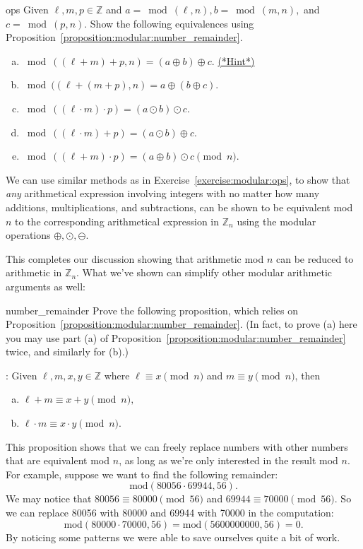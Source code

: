 \begin{exercise}{ops}
Given $\ell,m,p \in {\mathbb Z}$ and $a=\bmod(\ell,n), b=\bmod(m,n),$ and $c=\bmod(p,n)$.  Show the  following equivalences using Proposition~\ref{proposition:modular:number_remainder}.
\begin{enumerate}[(a)]
\item
$\bmod( (\ell +m) + p,n) = (a \oplus b) \oplus c$.\qquad
\hyperref[sec:modular_arithmetic:hints]{(*Hint*)}
\item
$\bmod( (\ell + (m + p),n) = a \oplus (b \oplus c)$.
\item
$\bmod( (\ell \cdot m) \cdot p) = (a \odot b) \odot c .$
\item
$ \bmod((\ell \cdot m) + p) = (a \odot b) \oplus c . $
\item
$ \bmod((\ell + m) \cdot p) = (a \oplus b) \odot c \pmod{n}. $
\end{enumerate}
\end{exercise}

We can use similar methods as in Exercise~\ref{exercise:modular:ops}, to show that \emph{any} arithmetical expression involving integers with no matter how many additions, multiplications, and subtractions, can be shown to be equivalent mod $n$ to the corresponding arithmetical expression in ${\mathbb Z}_n$ using the modular operations $\oplus, \odot, \ominus$.

This completes our discussion showing that arithmetic mod $n$ can be reduced to arithmetic in ${\mathbb Z}_n$.  What we've shown can simplify other modular arithmetic arguments as well:

\begin{exercise}{number_remainder}
Prove the following proposition, which relies on Proposition~\ref{proposition:modular:number_remainder}.  (In fact, to prove (a) here you may use  part (a) of   Proposition~\ref{proposition:modular:number_remainder} twice, and similarly for (b).)

: Given $\ell,m,x,y \in {\mathbb Z}$ where $\ell \equiv x \pmod{n}$ and $m \equiv y \pmod{n}$, then 

\begin{enumerate}[(a)]
\item
$\ell + m \equiv x + y \pmod{n},$ 
\item
$\ell \cdot m \equiv x \cdot y \pmod{n}$.
\end{enumerate}
\end{exercise}

This proposition shows that we can freely replace numbers with other numbers that are equivalent mod $n$,  as long as we're only interested in the result mod $n$. For example, suppose we  want to find the following remainder:  
\[
\text{mod}(80056 \cdot 69944, 56).  
\]
We may notice that $80056 \equiv 80000 \pmod{56}$ and $69944 \equiv 70000 \pmod{56}$.  So we can replace 80056 with 80000 and 69944 with 70000 in the computation:
\[
  \text{mod}(80000 \cdot 70000, 56)= \text{mod}(5600000000, 56)=0.
\]
By noticing some patterns we were able to save ourselves quite a bit of work.

